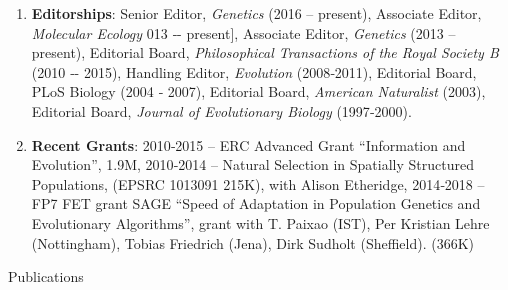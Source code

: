 \documentclass[10pt]{article}
\begin{document}
\begin{cv}
\begin{enumerate}
\item \textbf{Editorships}: Senior Editor, \textit{Genetics} (2016 -- present), Associate Editor, \textit{Molecular Ecology} 013 ‐- present], Associate Editor, \textit{Genetics} (2013 -- present), Editorial Board, \textit{Philosophical Transactions of the Royal Society B} (2010 ‐- 2015), Handling Editor, \textit{Evolution} (2008‐2011), Editorial Board, PLoS Biology (2004 ‐ 2007),  Editorial Board, \textit{American Naturalist} (2003),  Editorial Board, \textit{Journal of Evolutionary Biology} (1997‐2000).

\item \textbf{Recent Grants}: 2010‐2015  -- ERC Advanced Grant ``Information and Evolution”, \texteuro1.9M, 2010‐2014 -- Natural Selection in Spatially Structured Populations, (EPSRC 1013091 \texteuro215K), with Alison Etheridge, 2014‐2018 -- FP7 FET grant SAGE ``Speed of Adaptation in Population Genetics and Evolutionary Algorithms”, grant with T. Paixao (IST), Per Kristian Lehre (Nottingham), Tobias Friedrich (Jena), Dirk Sudholt (Sheffield). (\texteuro366K)

\end{enumerate} 


\begin{cvlist}{Publications}
\item
\end{cvlist}



\end{cv}
\end{document}

